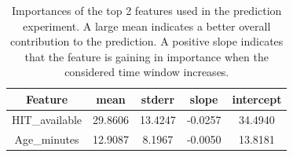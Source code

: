 \begin{table}[t!]
\begin{center}
\scriptsize
\caption {Importances of the top 2 features used in the prediction experiment. A large mean indicates a better overall contribution to the prediction. A positive slope indicates that the feature is gaining in importance when the considered time window increases.}
\begin{tabular}{|c|c|c|c|c|}
\hline
Feature              & mean      & stderr    & slope     & intercept \\
\hline
HIT\_available      & 29.8606 & 13.4247 & -0.0257 & 34.4940 \\
Age\_minutes           & 12.9087 &  8.1967 & -0.0050 & 13.8181 \\

\end{tabular}
\end{center}
\end{table}
